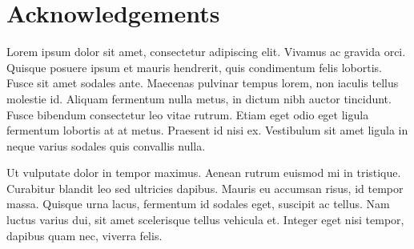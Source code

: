 \chapter*{Acknowledgements}

Lorem ipsum dolor sit amet, consectetur adipiscing elit. Vivamus ac gravida orci. Quisque posuere ipsum et mauris hendrerit, quis condimentum felis lobortis. Fusce sit amet sodales ante. Maecenas pulvinar tempus lorem, non iaculis tellus molestie id. Aliquam fermentum nulla metus, in dictum nibh auctor tincidunt. Fusce bibendum consectetur leo vitae rutrum. Etiam eget odio eget ligula fermentum lobortis at at metus. Praesent id nisi ex. Vestibulum sit amet ligula in neque varius sodales quis convallis nulla.

Ut vulputate dolor in tempor maximus. Aenean rutrum euismod mi in tristique. Curabitur blandit leo sed ultricies dapibus. Mauris eu accumsan risus, id tempor massa. Quisque urna lacus, fermentum id sodales eget, suscipit ac tellus. Nam luctus varius dui, sit amet scelerisque tellus vehicula et. Integer eget nisi tempor, dapibus quam nec, viverra felis.

\cleardoublepage